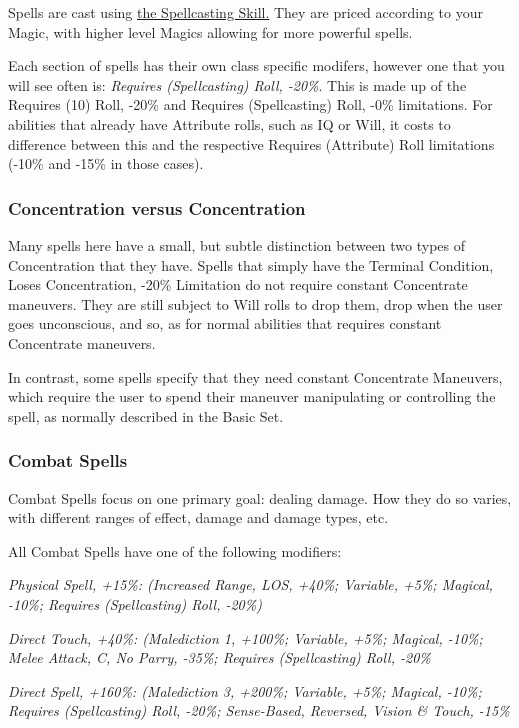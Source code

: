 \begin{multicols*}{3}
	Spells are cast using \hyperref[spellcasting_skill]{the Spellcasting Skill.} They are priced according to your Magic, with higher level Magics allowing for more powerful spells.
	
	Each section of spells has their own class specific modifers, however one that you will see often is:	\textit{Requires (Spellcasting) Roll, -20\%}. This is made up of the Requires (10) Roll, -20\% and Requires (Spellcasting) Roll, -0\% limitations. For abilities that already have Attribute rolls, such as IQ or Will, it costs to difference between this and the respective Requires (Attribute) Roll limitations (-10\% and -15\% in those cases). 
	
	\subsubsection{Concentration versus Concentration}
	
	Many spells here have a small, but subtle distinction between two types of Concentration that they have. Spells that simply have the Terminal Condition, Loses Concentration, -20\% Limitation do not require constant Concentrate maneuvers. They are still subject to Will rolls to drop them, drop when the user goes unconscious, and so, as for normal abilities that requires constant Concentrate maneuvers.
	
	In contrast, some spells specify that they need constant Concentrate Maneuvers, which require the user to spend their maneuver manipulating or controlling the spell, as normally described in the Basic Set.
	
	\subsubsection{Combat Spells}
	
	Combat Spells focus on one primary goal: dealing damage. How they do so varies, with different ranges of effect, damage and damage types, etc.
	
	All Combat Spells have one of the following modifiers:
	
	\textcolor{OliveGreen}{\textit{Physical Spell, +15\%: (Increased Range, LOS, +40\%; Variable, +5\%; Magical, -10\%; Requires (Spellcasting) Roll, -20\%)}}
	
	\textcolor{OliveGreen}{\textit{Direct Touch, +40\%: (Malediction 1, +100\%; Variable, +5\%; Magical, -10\%; Melee Attack, C, No Parry, -35\%; Requires (Spellcasting) Roll, -20\%}}
	
	\textcolor{OliveGreen}{\textit{Direct Spell, +160\%: (Malediction 3, +200\%; Variable, +5\%; Magical, -10\%; Requires (Spellcasting) Roll, -20\%; Sense-Based, Reversed, Vision \& Touch, -15\%}}
	

\end{multicols*}
